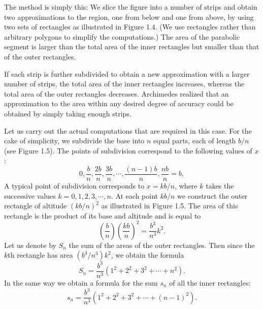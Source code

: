\documentclass[cn,11pt,chinese]{elegantbook}
\numberwithin{equation}{section}
\begin{document}
The method is simply this: We slice the figure into a number of strips and obtain two approximations to the region, one from below and one from above, by using two sets of rectangles as illustrated in Figure 1.4. (We use rectangles rather than arbitrary polygons to simplify the computations.) The area of the parabolic segment is larger than the total area of the inner rectangles but smaller than that of the outer rectangles.

If each strip is further subdivided to obtain a new approximation with a larger number of strips, the total area of the inner rectangles increases, whereas the total area of the outer rectangles decreases. Archimedes realized that an approximation to the area within any desired degree of accuracy could be obtained by simply taking enough strips.

Let us carry out the actual computations that are required in this case. For the cake of simplicity, we subdivide the base into $n$ equal parts, each of length $b/n$ (see Figure 1.5). The points of subdivision correspond to the following values of $x$:
\[
0, \frac{b}{n}, \frac{2b}{n}, \frac{3b}{n}, \cdots, \frac{(n-1)b}{n}, \frac{nb}{n} = b,
\]
A typical point of subdivision corresponds to $x=kb/n$, where $k$ takes the successive values $k=0,1,2,3,\cdots, n$. At each point $kb/n$ we construct the outer rectangle of altitude $(kb/n)^2$ as illustrated in Figure 1.5. The area of this rectangle is the product of its base and altitude and is equal to
\[
\left(\frac{b}{n}\right)\left(\frac{kb}{n}\right)^2 = \frac{b^3}{n^3}k^2.
\]
Let us denote by $S_n$ the sum of the areas of the outer rectangles. Then since the $k$th rectangle has area $(b^3/n^3)k^2$, we obtain the formula
\begin{equation}\label{equ001001}
S_n = \frac{b^3}{n^3}(1^2 + 2^2 + 3^2 + \cdots + n^2).
\end{equation}
In the same way we obtain a formula for the sum $s_n$ of all the inner rectangles:
\begin{equation}\label{equ001002}
s_n = \frac{b^3}{n^3}(1^2 + 2^2 + 3^2 + \cdots + (n-1)^2).
\end{equation}
\end{document}
